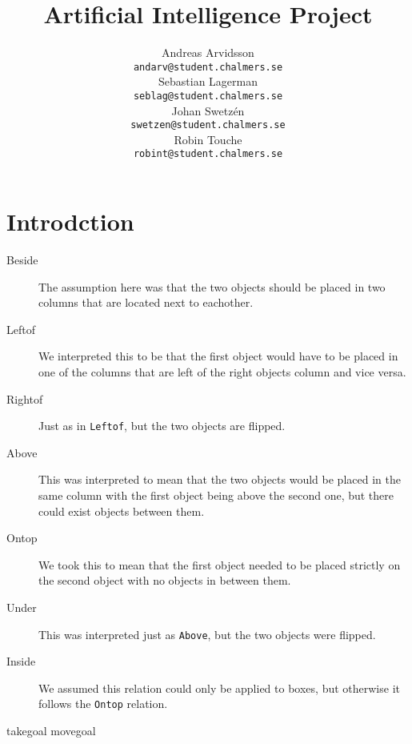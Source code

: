 \documentclass[11pt]{article}
\title{Artificial Intelligence Project}
\author{Andreas Arvidsson \\
  {\tt andarv@student.chalmers.se} \\
  Sebastian Lagerman \\
  {\tt seblag@student.chalmers.se} \\
  Johan Swetz\'{e}n \\
  {\tt swetzen@student.chalmers.se} \\
  Robin Touche \\
  {\tt robint@student.chalmers.se} \\}
\date{}
\begin{document}
\maketitle








\section*{Introdction}
\begin{description}
  \item[Beside] The assumption here was that the two objects should be placed in
    two columns that are located next to eachother.
  \item[Leftof] We interpreted this to be that the first object would have to be
    placed in one of the columns that are left of the right objects column and
    vice versa.
  \item[Rightof] Just as in \verb|Leftof|, but the two objects are flipped.
  \item[Above] This was interpreted to mean that the two objects would be placed
    in the same column with the first object being above the second one, but
    there could exist objects between them.
  \item[Ontop] We took this to mean that the first object needed to be placed
   strictly on the second object with no objects in between them.
  \item[Under] This was interpreted just as \verb|Above|, but the two objects
    were flipped.
  \item[Inside] We assumed this relation could only be applied to boxes, but
  otherwise it follows the \verb|Ontop| relation.
\end{description}
takegoal movegoal
\end{document}
